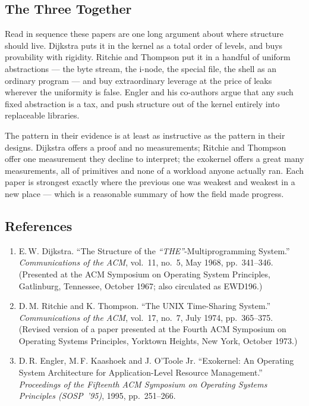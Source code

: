 \subsection*{The Three Together}
\label{p3:sec:together}

Read in sequence these papers are one long argument about where structure should live.
Dijkstra puts it in the kernel as a total order of levels, and buys provability with
rigidity. Ritchie and Thompson put it in a handful of uniform abstractions --- the byte
stream, the i-node, the special file, the shell as an ordinary program --- and buy
extraordinary leverage at the price of leaks wherever the uniformity is false. Engler and
his co-authors argue that any such fixed abstraction is a tax, and push structure out of the
kernel entirely into replaceable libraries.

The pattern in their evidence is at least as instructive as the pattern in their designs.
Dijkstra offers a proof and no measurements; Ritchie and Thompson offer one measurement they
decline to interpret; the exokernel offers a great many measurements, all of primitives and
none of a workload anyone actually ran. Each paper is strongest exactly where the previous
one was weakest and weakest in a new place --- which is a reasonable summary of how the field
made progress.

\subsection*{References}
\label{p3:sec:refs}

\begin{enumerate}
\item[{[1-10]}] E.\,W. Dijkstra. ``The Structure of the \textit{``THE''}-Multiprogramming
  System.'' \emph{Communications of the ACM}, vol.~11, no.~5, May 1968, pp.~341--346.
  (Presented at the ACM Symposium on Operating System Principles, Gatlinburg, Tennessee,
  October 1967; also circulated as EWD196.)
\item[{[1-2]}] D.\,M. Ritchie and K. Thompson. ``The UNIX Time-Sharing System.''
  \emph{Communications of the ACM}, vol.~17, no.~7, July 1974, pp.~365--375. (Revised version
  of a paper presented at the Fourth ACM Symposium on Operating Systems Principles, Yorktown
  Heights, New York, October 1973.)
\item[{[1-3]}] D.\,R. Engler, M.\,F. Kaashoek and J. O'Toole Jr. ``Exokernel: An Operating
  System Architecture for Application-Level Resource Management.'' \emph{Proceedings of the
  Fifteenth ACM Symposium on Operating Systems Principles (SOSP~'95)}, 1995, pp.~251--266.
\end{enumerate}
